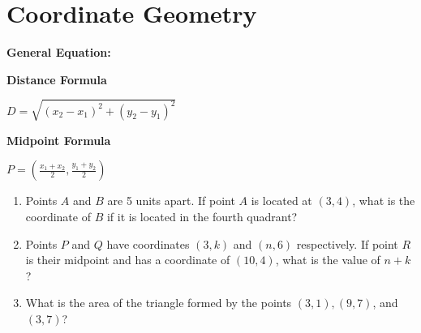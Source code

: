 \section{Coordinate Geometry}

\textbf{General Equation:}

\begin{center}
\begin{multicols}{2}
\setlength{\columnseprule}{0pt}
\textbf{Distance Formula}

\bigskip
$D=\sqrt{(x_2-x_1)^2+(y_2-y_1)^2}$

\textbf{Midpoint Formula}

\bigskip
$P=\left(\frac{x_1+x_2}{2},\frac{y_1+y_2}{2}\right)$
\end{multicols}
\end{center}

\vfill
\begin{enumerate}[labelindent=*,style=multiline,leftmargin=*,label=\textbf{Example \arabic*:}]
\item Points $A$ and $B$ are 5 units apart. If point $A$ is located at $(3,4)$, what is the coordinate of $B$ if it is located in the fourth quadrant?

\vfill\item Points $P$ and $Q$ have coordinates $(3,k)$ and $(n,6)$ respectively. If point $R$ is their midpoint and has a coordinate of $(10, 4)$, what is the value of $n+k$?

\vfill\item What is the area of the triangle formed by the points $(3,1), (9,7)$, and $(3,7)$?
\end{enumerate}

